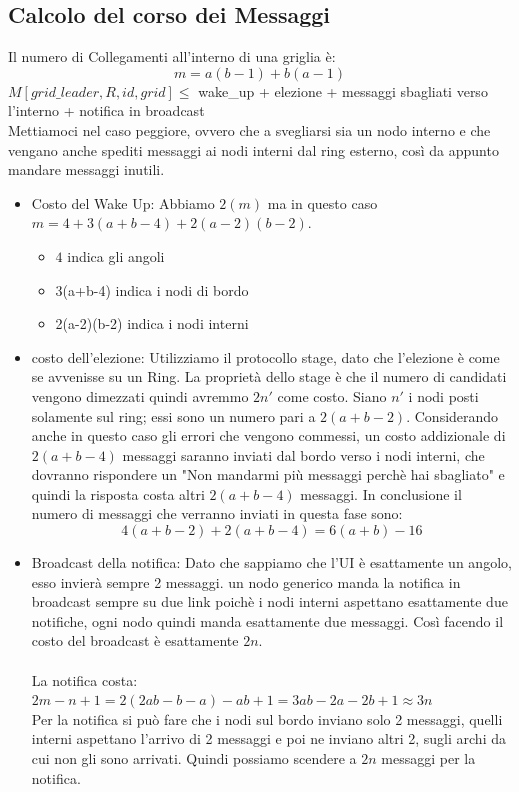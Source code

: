 \subsection{Calcolo del corso dei Messaggi}
Il numero di Collegamenti all'interno di una griglia è:
$$m=a(b-1)+b(a-1)$$ $M[grid\_leader,R,id,grid] \leq $ wake\_up + elezione +
messaggi sbagliati verso l'interno + notifica in broadcast\\
Mettiamoci nel caso peggiore, ovvero che a svegliarsi sia un nodo interno e che
vengano anche spediti messaggi ai nodi interni dal ring esterno, così da appunto
mandare messaggi inutili.
\begin{itemize}
    \item Costo del Wake Up: Abbiamo $2(m)$ ma in questo caso $m =
              4+3(a+b-4)+2(a-2)(b-2)$.
          \begin{itemize}
              \item $4$ indica gli angoli
              \item 3(a+b-4) indica i nodi di bordo
              \item 2(a-2)(b-2) indica i nodi interni
          \end{itemize}
    \item costo dell'elezione: Utilizziamo il protocollo stage, dato che
          l'elezione è come se avvenisse su un Ring. La proprietà dello stage è che il
          numero di candidati vengono dimezzati quindi avremmo $2n'$ come costo. Siano
          $n'$ i nodi posti solamente sul ring; essi sono un numero pari a $2(a+b-2)$.
          Considerando anche in questo caso gli errori che vengono commessi, un costo
          addizionale di $2(a+b-4)$ messaggi saranno inviati dal bordo verso i nodi
          interni, che dovranno rispondere un "Non mandarmi più messaggi perchè hai
          sbagliato" e quindi la risposta costa altri $2(a+b-4)$ messaggi. In
          conclusione il numero di messaggi che verranno inviati in questa fase sono:
          $$4(a+b-2)+2(a+b-4) = 6(a+b)-16$$
    \item Broadcast della notifica: Dato che sappiamo che l'UI è esattamente un
          angolo, esso invierà sempre 2 messaggi. un nodo generico manda la notifica in
          broadcast sempre su due link poichè i nodi interni aspettano esattamente due
          notifiche, ogni nodo quindi manda esattamente due messaggi. Così facendo il
          costo del broadcast è esattamente $2n$.\\\\La notifica costa: $2m - n +1 = 2
              (2ab -b-a) -ab +1 = 3ab-2a-2b+1 \approx 3n$\\
          Per la notifica si può fare che i nodi sul bordo inviano solo 2
          messaggi, quelli interni aspettano l'arrivo di 2 messaggi e poi ne
          inviano altri 2, sugli archi da cui non gli sono arrivati. Quindi
          possiamo scendere a $2n$ messaggi per la notifica.
\end{itemize}
